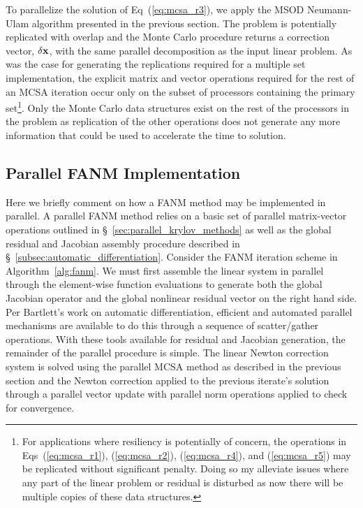 To parallelize the solution of Eq~(\ref{eq:mcsa_r3}), we apply the
MSOD Neumann-Ulam algorithm presented in the previous section. The
problem is potentially replicated with overlap and the Monte Carlo
procedure returns a correction vector, $\delta \mathbf{x}$, with the same
parallel decomposition as the input linear problem. As was the case
for generating the replications required for a multiple set
implementation, the explicit matrix and vector operations required for
the rest of an MCSA iteration occur only on the subset of processors
containing the primary set\footnote{For applications where resiliency
  is potentially of concern, the operations in Eqs~(\ref{eq:mcsa_r1}),
  (\ref{eq:mcsa_r2}), (\ref{eq:mcsa_r4}), and (\ref{eq:mcsa_r5}) may
  be replicated without significant penalty. Doing so my alleviate
  issues where any part of the linear problem or residual is disturbed
  as now there will be multiple copies of these data
  structures.}. Only the Monte Carlo data structures exist on the rest
of the processors in the problem as replication of the other
operations does not generate any more information that could be used
to accelerate the time to solution.

\subsection{Parallel FANM Implementation}
\label{subsec:parallel_fanm}
Here we briefly comment on how a FANM method may be implemented in
parallel. A parallel FANM method relies on a basic set of parallel
matrix-vector operations outlined in
\S~\ref{sec:parallel_krylov_methods} as well as the global residual
and Jacobian assembly procedure described in
\S~\ref{subsec:automatic_differentiation}. Consider the FANM iteration
scheme in Algorithm~\ref{alg:fanm}. We must first assemble the linear
system in parallel through the element-wise function evaluations to
generate both the global Jacobian operator and the global nonlinear
residual vector on the right hand side. Per Bartlett's work on
automatic differentiation, efficient and automated parallel mechanisms
are available to do this through a sequence of scatter/gather
operations. With these tools available for residual and Jacobian
generation, the remainder of the parallel procedure is simple. The
linear Newton correction system is solved using the parallel MCSA
method as described in the previous section and the Newton correction
applied to the previous iterate's solution through a parallel vector
update with parallel norm operations applied to check for
convergence.

